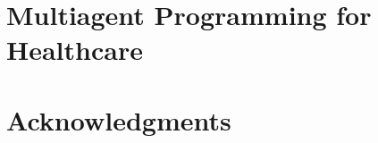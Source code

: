 \usepackage{lipsum}




\coverpage{\TITLE}{\SUBTITLE}{\AUTHOR}{\DATE}{\SUBJECT}

\newpage



\tableofcontents

\listoffigures

\listoftables


\printnomenclature

\newpage


\newpage


\newpage


\newpage


\newpage


\newpage


\newpage


\newpage
\chapter{Multiagent Programming for Healthcare}\label{ch:seidrforhealth}

\newpage


\newpage




\newpage
\chapter{Acknowledgments}



\printbibliography


